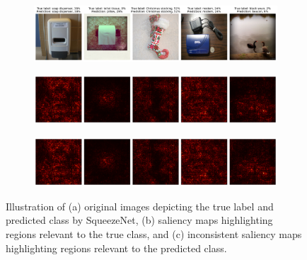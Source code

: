 
\begin{figure}[H]
    \centering
    \begin{subfigure}{0.95\textwidth}
        \includegraphics[width=\textwidth]{bad_images}
        \caption{}
        \label{subfig:bad_images}
    \end{subfigure}
    \begin{subfigure}{0.95\textwidth}
        \includegraphics[width=\textwidth]{bad_true_class_saliency}
        \caption{}
        \label{subfig:bad_true_class_saliency}
    \end{subfigure}
    \begin{subfigure}{0.95\textwidth}
        \includegraphics[width=\textwidth]{bad_predicted_class_saliency}
        \caption{}
        \label{subfig:bad_predicted_class_saliency}
    \end{subfigure}
    \caption{Illustration of (a) original images depicting the true label and predicted class by SqueezeNet, (b) saliency maps highlighting regions relevant to the true class, and (c) inconsistent saliency maps highlighting regions relevant to the predicted class.}
    \label{fig:bad_saliency_map}
\end{figure}

